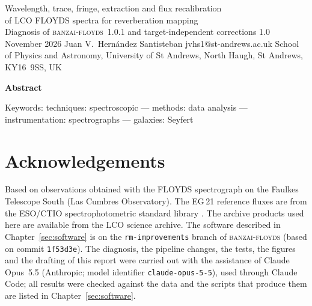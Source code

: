 \documentclass[10pt,a4paper,oneside]{report}
\newcommand{\banzai}{\textsc{banzai-floyds}}
\begin{document}
\avatitlepage
  {Wavelength, trace, fringe, extraction and flux recalibration\\
   of LCO FLOYDS spectra for reverberation mapping\\[4pt]
   {\normalsize\upshape Diagnosis of \banzai~1.0.1
    and target-independent corrections}}
  {1.0}
  {November 2026}
  {Juan V.\ Hern\'andez Santisteban}
  {jvhs1@st-andrews.ac.uk}
  {School of Physics and Astronomy, University of St Andrews,
   North Haugh, St Andrews, KY16~9SS, UK}

\begin{titlepage}
\vspace*{2cm}
{\large\bfseries\color{avaInkBlue} Abstract\par}
\vspace{0.6em}

\vfill
{\small\color{avaInkBlue!70}%
  Keywords: techniques: spectroscopic ---
  methods: data analysis ---
  instrumentation: spectrographs ---
  galaxies: Seyfert}
\end{titlepage}

\tableofcontents
\clearpage
















\chapter*{Acknowledgements}
Based on observations obtained with the FLOYDS spectrograph on the Faulkes Telescope South (Las Cumbres Observatory).
The EG\,21 reference fluxes are from the ESO/CTIO spectrophotometric standard library \citep{Hamuy1992,Hamuy1994}.
The archive products used here are available from the LCO science archive. The software described in
Chapter~\ref{sec:software} is on the \texttt{rm-improvements} branch of \banzai{} (based on commit \texttt{1f53d3e}).
The diagnosis, the pipeline changes, the tests, the figures and the drafting of this report were carried out with the
assistance of Claude Opus~5.5 (Anthropic; model identifier \texttt{claude-opus-5-5}), used through Claude Code;
all results were checked against the data and the scripts that produce them are listed in
Chapter~\ref{sec:software}.
\end{document}
